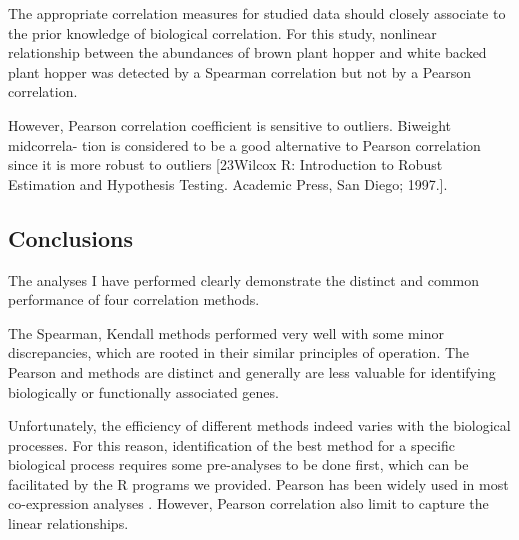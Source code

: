 The appropriate correlation measures for studied data should closely associate to the prior knowledge of biological correlation. For this study, nonlinear relationship between the abundances of brown plant hopper and white backed plant hopper was detected by a Spearman correlation but not by a Pearson correlation.

However, Pearson correlation coefficient is sensitive to outliers. Biweight midcorrela- tion is considered to be a good alternative to Pearson correlation since it is more robust to outliers [23Wilcox R: Introduction to Robust Estimation and Hypothesis Testing. Academic Press, San Diego; 1997.].

\subsection{Conclusions}

The analyses I have performed clearly demonstrate the distinct and common performance of four correlation methods. 

The Spearman, Kendall methods performed very well with some minor discrepancies, which are rooted in their similar principles of operation. The Pearson and methods are distinct and generally are less valuable for identifying biologically or functionally associated genes. 

Unfortunately, the efficiency of different methods indeed varies with the biological processes. For this reason, identification of the best method for a specific biological process requires some pre-analyses to be done first, which can be facilitated by the R programs we provided.
Pearson has been widely used in most co-expression analyses \citep{Zhang_2005_General}. However, Pearson correlation also limit to capture the linear relationships. 